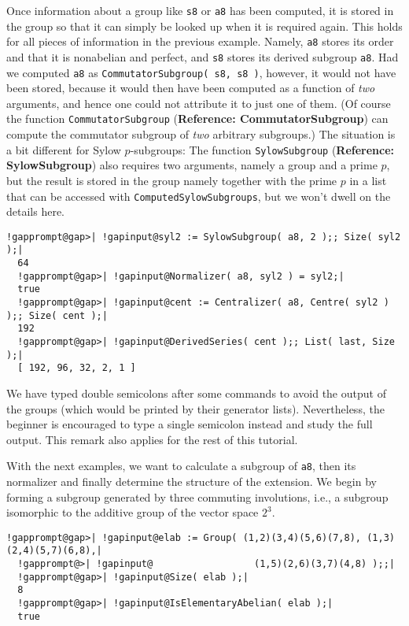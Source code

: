 \documentclass[a4paper,11pt]{report}
\begin{document}
{{ Once information about a group like \texttt{s8} or \texttt{a8} has been computed, it is stored in the group so that it can simply be looked
up when it is required again. This holds for all pieces of information in the
previous example. Namely, \texttt{a8} stores its order and that it is nonabelian and perfect, and \texttt{s8} stores its derived subgroup \texttt{a8}. Had we computed \texttt{a8} as \texttt{CommutatorSubgroup( s8, s8 )}, however, it would not have been stored, because it would then have been
computed as a function of \emph{two} arguments, and hence one could not attribute it to just one of them. (Of
course the function \texttt{CommutatorSubgroup} (\textbf{Reference: CommutatorSubgroup}) can compute the commutator subgroup of \emph{two} arbitrary subgroups.) The situation is a bit different for Sylow $p$-subgroups: The function \texttt{SylowSubgroup} (\textbf{Reference: SylowSubgroup}) also requires two arguments, namely a group and a prime $p$, but the result is stored in the group {\textendash}namely together with the
prime $p$ in a list that can be accessed with \texttt{ComputedSylowSubgroups}, but we won't dwell on the details here. 

 
\begin{Verbatim}[commandchars=!@|,fontsize=\small,frame=single,label=Example]
  !gapprompt@gap>| !gapinput@syl2 := SylowSubgroup( a8, 2 );; Size( syl2 );|
  64
  !gapprompt@gap>| !gapinput@Normalizer( a8, syl2 ) = syl2;|
  true
  !gapprompt@gap>| !gapinput@cent := Centralizer( a8, Centre( syl2 ) );; Size( cent );|
  192
  !gapprompt@gap>| !gapinput@DerivedSeries( cent );; List( last, Size );|
  [ 192, 96, 32, 2, 1 ]
\end{Verbatim}
 

 We have typed double semicolons after some commands to avoid the output of the
groups (which would be printed by their generator lists). Nevertheless, the
beginner is encouraged to type a single semicolon instead and study the full
output. This remark also applies for the rest of this tutorial. 

 With the next examples, we want to calculate a subgroup of \texttt{a8}, then its normalizer and finally determine the structure of the extension. We
begin by forming a subgroup generated by three commuting involutions, i.e., a
subgroup isomorphic to the additive group of the vector space $2^3$. 

 
\begin{Verbatim}[commandchars=!@|,fontsize=\small,frame=single,label=Example]
  !gapprompt@gap>| !gapinput@elab := Group( (1,2)(3,4)(5,6)(7,8), (1,3)(2,4)(5,7)(6,8),|
  !gapprompt@>| !gapinput@                  (1,5)(2,6)(3,7)(4,8) );;|
  !gapprompt@gap>| !gapinput@Size( elab );|
  8
  !gapprompt@gap>| !gapinput@IsElementaryAbelian( elab );|
  true
\end{Verbatim}
 

}}
\end{document}
